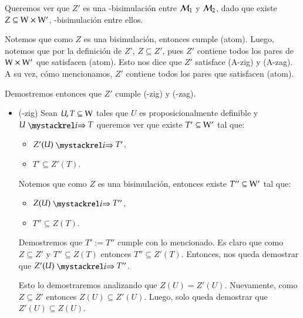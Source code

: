 \begin{demostracion}
    Queremos ver que $Z'$ es una \KHilogic-bisimulación entre $\mathcal{M}_1$ y $\mathcal{M}_2$,
    dado que existe $Z \subseteq \mathrm{W} \times \mathrm{W}'$, \KHilogic-bisimulación entre ellos.

    Notemos que como $Z$ es una bisimulación, entonces cumple (atom). Luego, notemos que
    por la definición de $Z'$, $Z \subseteq Z'$, pues $Z'$ contiene todos los pares de
    $\mathrm{W} \times \mathrm{W}'$ que satisfacen (atom). Esto nos dice que $Z'$ satisface (A-zig) y (A-zag).
    A su vez, cómo mencionamos, $Z'$ contiene todos los pares que satisfacen (atom).

    Demostremos entonces que $Z'$ cumple (\KHilogic-zig) y (\KHilogic-zag).

    \begin{itemize}
        \item (\KHilogic-zig) Sean $U,T \subseteq \mathrm{W}$ tales que $U$ es proposicionalmente definible 
        y $U \ultsExecAgi T$ queremos ver que existe $T' \subseteq \mathrm{W}'$ tal que:
    
        \begin{multicols}{2}
            \begin{itemize}
                \item $Z'(U) \ultsExecAgi T'$, 
                \item $T' \subseteq Z'(T)$.
            \end{itemize}
        \end{multicols}
    
        Notemos que como $Z$ es una bisimulación, entonces existe $T'' \subseteq \mathrm{W}'$ tal que:
    
        \begin{multicols}{2}
            \begin{itemize}
                \item $Z(U) \ultsExecAgi T''$, 
                \item $T'' \subseteq Z(T)$.
            \end{itemize}
        \end{multicols}
    
        Demostremos que $T' := T''$ cumple con lo mencionado. Es claro que como $Z \subseteq Z'$ y 
        $T'' \subseteq Z(T)$ entonces $T'' \subseteq Z'(T)$. Entonces, nos queda demostrar que $Z'(U) \ultsExecAgi T''$.
    
        Esto lo demostraremos analizando que $Z(U) = Z'(U)$. Nuevamente, como $Z \subseteq Z'$
        entonces $Z(U) \subseteq Z'(U)$. Luego, solo queda demostrar que $Z'(U) \subseteq Z(U)$.
    

\end{itemize}
\end{demostracion}

